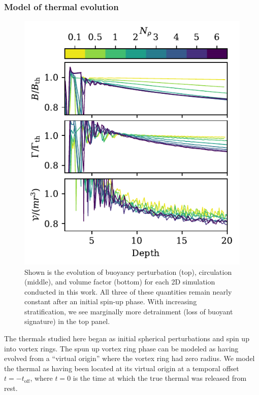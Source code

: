 \subsubsection{Model of thermal evolution}
\begin{figure}[p!]
    \includegraphics[width=\columnwidth]{./figs/constants.pdf}
    \caption[Traces showing simulation values of quantities assumed to be constant in thermal evolution theory]
	{
	Shown is the evolution of buoyancy perturbation (top), circulation (middle), and volume factor (bottom) for each 2D simulation conducted in this work.
	All three of these quantities remain nearly constant after an initial spin-up phase.
	With increasing stratification, we see marginally more detrainment (loss of buoyant signature) in the top panel.
    \label{fig:constants} }
\end{figure}

The thermals studied here began as initial spherical perturbations and spin up into vortex rings.
The spun up vortex ring phase can be modeled as having evolved from a ``virtual origin'' where the vortex ring had zero radius.
We model the thermal as having been located at its virtual origin at a temporal offset $t = -t_{\text{off}}$, where $t = 0$ is the time at which the true thermal was released from rest.

